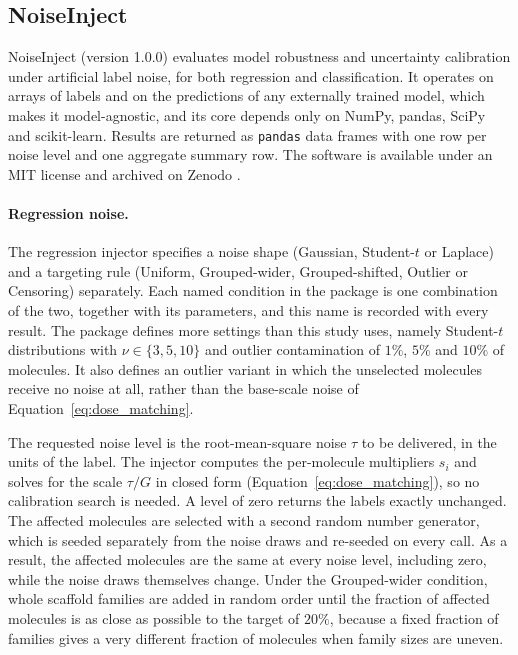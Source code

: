 \subsection{NoiseInject}\label{sec:noiseinject_pkg} %

NoiseInject (version 1.0.0) evaluates model robustness and uncertainty calibration under artificial
label noise, for both regression and classification. It operates on arrays of labels and on the
predictions of any externally trained model, which makes it model-agnostic, and its core depends only
on NumPy, pandas, SciPy and scikit-learn. Results are returned as \texttt{pandas} data frames with one
row per noise level and one aggregate summary row. The software is available under an MIT license
and archived on Zenodo \citep{noiseinject}.

\paragraph{Regression noise.} The regression injector specifies a noise shape (Gaussian, Student-$t$ or
Laplace) and a targeting rule (Uniform, Grouped-wider, Grouped-shifted, Outlier or Censoring)
separately. Each named condition in the package is one combination of the two, together with its
parameters, and this name is recorded with every result. The package defines more settings
than this study uses, namely Student-$t$ distributions with $\nu \in \{3, 5, 10\}$ and outlier contamination of $1\%$,
$5\%$ and $10\%$ of molecules. It also defines an outlier variant in which the unselected molecules receive no
noise at all, rather than the base-scale noise of Equation~\ref{eq:dose_matching}.

The requested noise level is the root-mean-square noise $\tau$ to be delivered, in the units of the label. The
injector computes the per-molecule multipliers $s_i$ and solves for the scale $\tau / G$ in closed
form (Equation~\ref{eq:dose_matching}), so no calibration search is needed. A level of zero returns the
labels exactly unchanged. The affected molecules are selected with a second random number generator,
which is seeded separately from the noise draws and re-seeded on every call. As a result, the affected molecules are
the same at every noise level, including zero, while the noise draws themselves change. Under the
Grouped-wider condition, whole scaffold families are added in random order until the fraction of affected
molecules is as close as possible to the target of $20\%$, because a fixed fraction of families
gives a very different fraction of molecules when family sizes are uneven.

